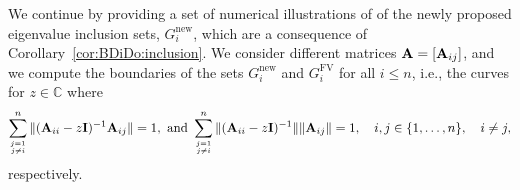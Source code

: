 \newpage

We continue by providing a set of numerical illustrations of of the newly
proposed eigenvalue inclusion sets, $G_i^{\text{new}}$, which are a consequence
of Corollary~\ref{cor:BDiDo:inclusion}. We consider different matrices
$\mathbf{A}=[\mathbf{A}_{ij}]$, and we compute the boundaries of the sets $G_i^{\text{new}}$ and
$G_i^{\text{FV}}$ for all $i\leq n$, i.e., the curves for $z\in {\mathbb C}$
where
\begin{equation*}
\sum_{\atopfrac{j=1}{j\neq i}}^{n}\| (\A_{ii}-z \I)^{-1} \A_{ij} \|=1,\text{ and }
\sum_{\atopfrac{j=1}{j\neq i}}^{n}\| (\A_{ii}-z \I)^{-1}\|\| \A_{ij} \|=1,
\quad i,j\in\{1,\ldots,n\},\quad i\neq j,
\end{equation*}
%
respectively.

